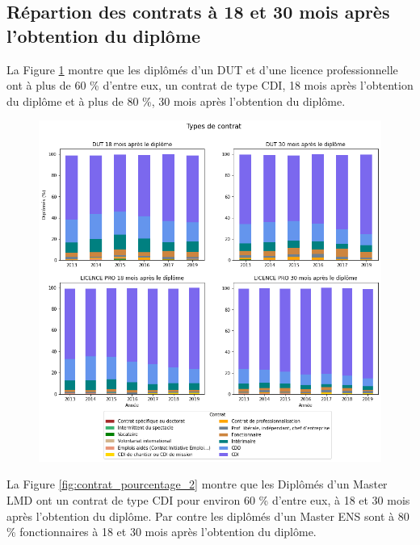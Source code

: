 \documentclass[12pt, a4paper, titlepage, table]{article}
\begin{document}
\newpage

	\subsection{Répartion des contrats à 18 et 30 mois après l'obtention du diplôme}
	La Figure \ref{fig:contrat_pourcentage_1} montre que les diplômés d'un DUT et d'une licence professionnelle ont à plus de 60 \%  d'entre eux, un contrat de type CDI, 18 mois après l'obtention du diplôme et à plus de 80 \%, 30 mois après l'obtention du diplôme.   
	
		\begin{figure}[H]
			\centering
			\includegraphics[width=1\textwidth]{../graphs/repartition_contrats_situation_1.png}
			\label{fig:contrat_pourcentage_1}
		\end{figure}
	
	La Figure \ref{fig:contrat_pourcentage_2} montre que les Diplômés d'un Master LMD ont un contrat de type CDI pour environ 60 \% d'entre eux, à 18 et 30 mois après l'obtention du diplôme.
	Par contre les diplômés d'un Master ENS sont à 80 \% fonctionnaires à 18 et 30 mois après l'obtention du diplôme. 
\end{document}
